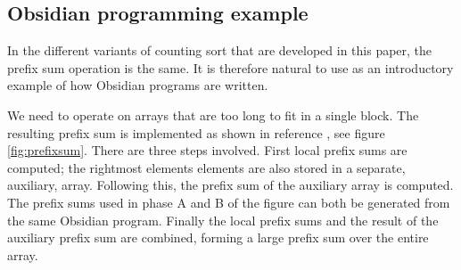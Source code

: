 \subsection{Obsidian programming example} 
\label{sec:sklansky}
\FloatBarrier

In the different variants of counting sort that are developed in this
paper, the prefix sum operation is the same. It is therefore natural
to use as an introductory example of how Obsidian programs are
written.

We need to operate on arrays that are too long to fit in a single block.
The resulting prefix sum is implemented as shown in reference 
\cite{LargeScan}, see figure \ref{fig:prefixsum}. There are three steps 
involved. First local prefix sums are computed; the rightmost elements elements are also stored in a separate, auxiliary, array. Following this, 
the prefix sum of the auxiliary array is  computed. The prefix sums used 
in phase A and B of the 
figure can both be generated from the same Obsidian program. Finally the 
local prefix sums and the result of the auxiliary prefix sum are combined, 
forming a large prefix sum over the entire array. 

